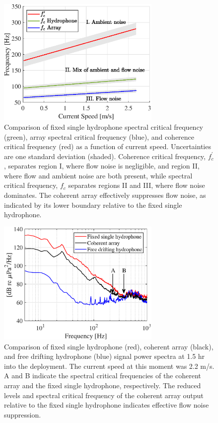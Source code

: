 \documentclass[12pt,journal,onecolumn]{IEEEtran}
\begin{document}
\begin{figure}[!t]
	\begin{center}
		\includegraphics[width=0.7\textwidth]{figure7.eps}
	\end{center}
	\caption[Comparison of spectral sloping and spatial coherence thresholding]{
	\label{f:array_perform}
	Comparison of fixed single hydrophone spectral critical frequency (green), array spectral critical frequency (blue), and coherence critical frequency (red) as a function of current speed. Uncertainties are one standard deviation (shaded). Coherence critical frequency, $f^\prime_c$, separates region I, where flow noise is negligible, and region II, where flow and ambient noise are both present, while spectral critical frequency, $f_c$  separates regions II and III, where flow noise dominates. The coherent array effectively suppresses flow noise, as indicated by its lower boundary relative to the fixed single hydrophone. }
\end{figure}
\begin{figure}[!t]
	\begin{center}
		\includegraphics[width=0.7\textwidth]{figure8.eps} 
	\end{center}
	\caption[Comparison of hydrophone, coherent array, and guard buoy signals]{
	\label{f:comparison}
	Comparison of fixed single hydrophone (red), coherent array (black), and free drifting hydrophone (blue) signal power spectra at 1.5 hr into the deployment. The current speed at this moment was 2.2 m/s. A and B indicate the spectral critical frequencies of the coherent array and the fixed single hydrophone, respectively. The reduced levels and spectral critical frequency of the coherent array output relative to the fixed single hydrophone indicates effective flow noise suppression.  }
\end{figure}
\end{document}
